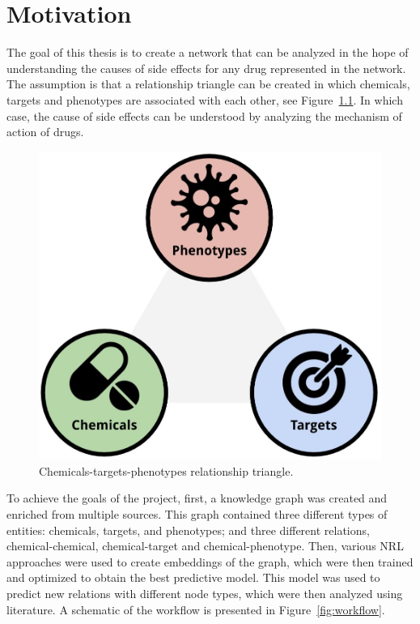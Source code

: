\chapter{Motivation}\label{motivation}

The goal of this thesis is to create a network that can be analyzed in the hope of understanding the causes of side effects for any drug represented in the network.
The assumption is that a relationship triangle can be created in which chemicals, targets and phenotypes are associated with each other, see Figure~\ref{fig:triangle}.
In which case, the cause of side effects can be understood by analyzing the mechanism of action of drugs.

\begin{figure}[!ht]
    \centering
    \includegraphics[scale=0.175]
    {figures/triangle.jpg}
    \caption{\label{fig:triangle} Chemicals-targets-phenotypes relationship triangle.}
\end{figure}

To achieve the goals of the project, first, a knowledge graph was created and enriched from multiple sources.
This graph contained three different types of entities: chemicals, targets, and phenotypes; and three different relations, chemical-chemical, chemical-target and chemical-phenotype.
Then, various \ac{NRL} approaches were used to create embeddings of the graph, which were then trained and optimized to obtain the best predictive model.
This model was used to predict new relations with different node types, which were then analyzed using literature.
A schematic of the workflow is presented in Figure~\ref{fig:workflow}.

